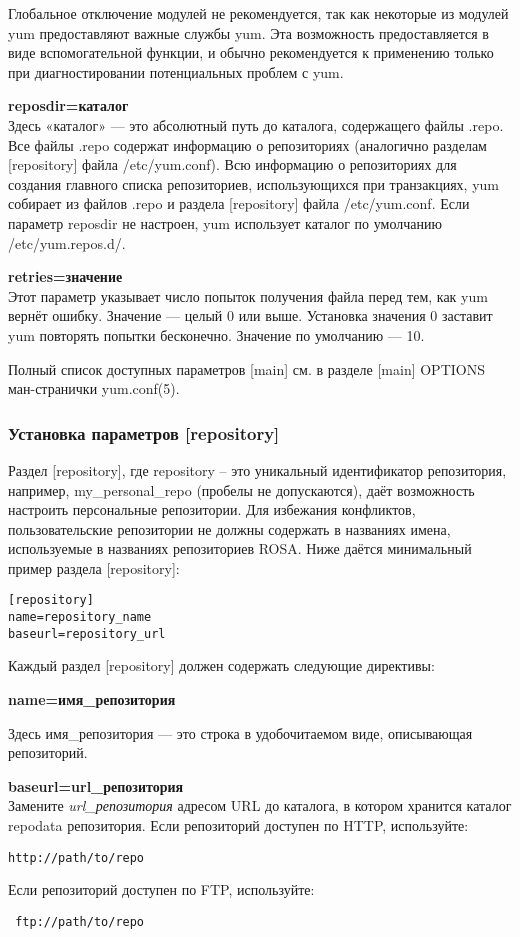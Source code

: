 \documentclass[a4paper,10pt,twoside]{article}
\begin{document}
Глобальное отключение модулей не рекомендуется, так как некоторые из модулей yum предоставляют важные службы yum. Эта возможность предоставляется в виде вспомогательной функции, и обычно рекомендуется к применению только при диагностировании потенциальных проблем с yum.


\textbf{reposdir=каталог}\\
Здесь «каталог» — это абсолютный путь до каталога, содержащего файлы .repo. Все файлы .repo содержат информацию о репозиториях (аналогично разделам [repository] файла /etc/yum.conf). Всю информацию о репозиториях для создания главного списка репозиториев, использующихся при транзакциях, yum собирает из файлов .repo и раздела [repository] файла /etc/yum.conf. Если параметр reposdir не настроен, yum использует каталог по умолчанию /etc/yum.repos.d/.


\textbf{retries=значение}\\
Этот параметр указывает число попыток получения файла перед тем, как yum вернёт ошибку. Значение — целый 0 или выше. Установка значения 0 заставит yum повторять попытки бесконечно. Значение по умолчанию — 10.

Полный список доступных параметров [main] см. в разделе [main] OPTIONS ман-странички yum.conf(5).


\subsubsection{Установка параметров [repository]}
Раздел [repository], где repository -- это уникальный идентификатор репозитория, например, my\_personal\_repo (пробелы не допускаются), даёт возможность настроить персональные репозитории. Для избежания конфликтов, пользовательские репозитории не должны содержать в названиях имена, используемые в названиях репозиториев ROSA. Ниже даётся минимальный пример раздела 
[repository]:

\begin{verbatim}
[repository]
name=repository_name
baseurl=repository_url
\end{verbatim} 



Каждый раздел [repository] должен содержать следующие директивы:

\textbf{name=имя\_репозитория}

Здесь имя\_репозитория — это строка в удобочитаемом виде, описывающая репозиторий.

\textbf{baseurl=url\_репозитория}\\
Замените \textit{url\_репозитория} адресом URL до каталога, в котором хранится каталог repodata репозитория.
Если репозиторий доступен по HTTP, используйте: 
\begin{verbatim}
http://path/to/repo
\end{verbatim} 
Если репозиторий доступен по FTP, используйте:
\begin{verbatim}
 ftp://path/to/repo
\end{verbatim} 
\end{document}
